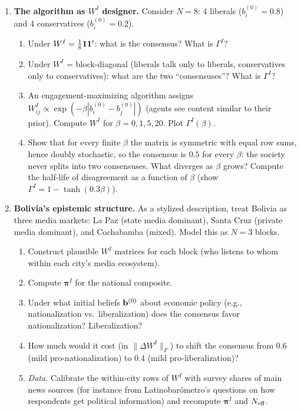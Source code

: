 \documentclass[../structural_economics_book.tex]{subfiles}
\begin{document}
\begin{enumerate}[label=\textbf{8.\arabic*}, leftmargin=3em]
\item \textbf{The algorithm as $W^I$ designer.} Consider $N = 8$: 4 liberals ($b^{(0)}_i = 0.8$) and 4 conservatives ($b^{(0)}_i = 0.2$).
\begin{enumerate}
\item Under $W^I = \frac{1}{8}\mathbf{1}\mathbf{1}'$: what is the consensus? What is $\Gamma^I$?
\item Under $W^I$ = block-diagonal (liberals talk only to liberals, conservatives only to conservatives): what are the two ``consensuses''? What is $\Gamma^I$?
\item An engagement-maximizing algorithm assigns $W^I_{ij} \propto \exp(-\beta|b_i^{(0)} - b_j^{(0)}|)$ (agents see content similar to their prior). Compute $W^I$ for $\beta = 0, 1, 5, 20$. Plot $\Gamma^I(\beta)$.
\item Show that for every finite $\beta$ the matrix is symmetric with equal row sums, hence doubly stochastic, so the consensus is $0.5$ for every $\beta$: the society never splits into two consensuses. What diverges as $\beta$ grows? Compute the half-life of disagreement as a function of $\beta$ (show $\Gamma^I = 1 - \tanh(0.3\beta)$).
\end{enumerate}

\item \textbf{Bolivia's epistemic structure.} As a stylized description, treat Bolivia as three media markets: La Paz (state media dominant), Santa Cruz (private media dominant), and Cochabamba (mixed). Model this as $N = 3$ blocks.
\begin{enumerate}
\item Construct plausible $W^I$ matrices for each block (who listens to whom within each city's media ecosystem).
\item Compute $\boldsymbol{\pi}^I$ for the national composite.
\item Under what initial beliefs $\mathbf{b}^{(0)}$ about economic policy (e.g., nationalization vs.\ liberalization) does the consensus favor nationalization? Liberalization?
\item How much would it cost (in $\|\Delta W^I\|_F$) to shift the consensus from 0.6 (mild pro-nationalization) to 0.4 (mild pro-liberalization)?
\item \textit{Data.} Calibrate the within-city rows of $W^I$ with survey shares of main news sources (for instance from Latinobar\'{o}metro's questions on how respondents get political information) and recompute $\boldsymbol{\pi}^I$ and $N_{\text{eff}}$.
\end{enumerate}


\end{enumerate}
\end{document}
